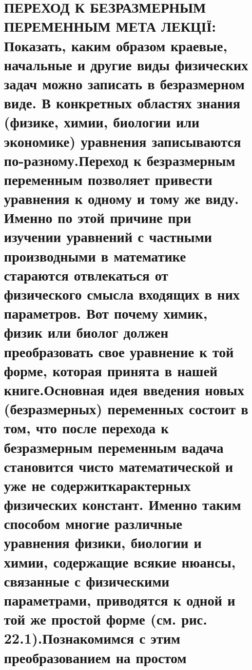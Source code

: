 \documentclass[
  ukrainian,
]{article}
\begin{document}
\section{ПЕРЕХОД К БЕЗРАЗМЕРНЫМ ПЕРЕМЕННЫМ МЕТА ЛЕКЦІЇ: Показать, каким
образом краевые, начальные и другие виды физических задач можно записать
в безразмерном виде. В конкретных областях знания (физике, химии,
биологии или экономике) уравнения записываются по-разному.Переход к
безразмерным переменным позволяет привести уравнения к одному и тому же
виду. Именно по этой причине при изучении уравнений с частными
производными в математике стараются отвлекаться от физического смысла
входящих в них параметров. Вот почему химик, физик или биолог должен
преобразовать свое уравнение к той форме, которая принята в нашей
книге.Основная идея введения новых (безразмерных) переменных состоит в
том, что после перехода к безразмерным переменным вадача становится
чисто математической и уже не содержиткарактерных физических констант.
Именно таким способом многие различные уравнения физики, биологии и
химии, содержащие всякие нюансы, связанные с физическими параметрами,
приводятся к одной и той же простой форме (см. рис. 22.1).Познакомимся с
этим преобразованием на простом
}
\end{document}

